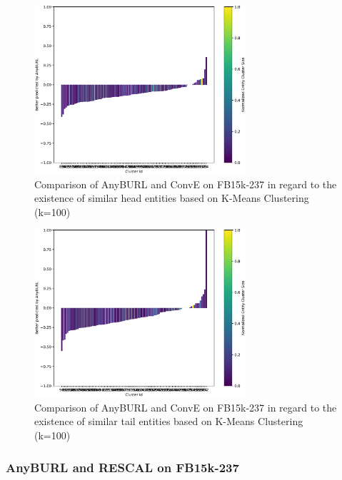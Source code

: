 \begin{figure}[H]
\centering
\includegraphics[width=0.7\textwidth]{images/head_cluster_100_anyburl_conve_fb15k.PNG}
\caption{Comparison of AnyBURL and ConvE on FB15k-237 in regard to the existence of similar head entities based on K-Means Clustering (k=100)}
\label{fig:head_cluster_100_anyburl_conve_fb15k}
\end{figure}

\begin{figure}[H]
\centering
\includegraphics[width=0.7\textwidth]{images/tail_cluster_100_anyburl_conve_fb15k.PNG}
\caption{Comparison of AnyBURL and ConvE on FB15k-237 in regard to the existence of similar tail entities based on K-Means Clustering (k=100)}
\label{fig:tail_cluster_100_anyburl_conve_fb15k}
\end{figure}

\subsubsection{AnyBURL and RESCAL on FB15k-237}

